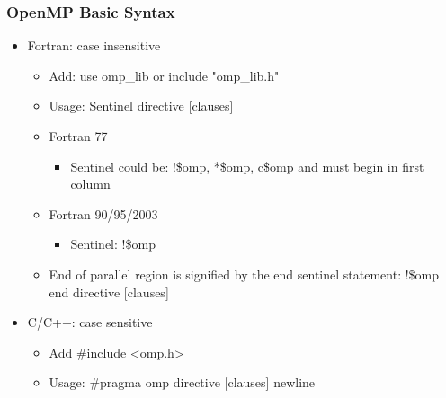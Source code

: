 \documentclass[10pt,t]{beamer}
\begin{document}
\begin{frame}
  \frametitle{OpenMP Basic Syntax}
  \begin{itemize}
    \item Fortran: case insensitive
    \begin{itemize}
      \item Add: {\color{green!40!black}use} {\color{blue}omp\_lib} or {\color{green!40!black}include} {\color{orange}"omp\_lib.h"}
      \item Usage: {\color{red!90!black}Sentinel directive [clauses]}
      \item Fortran 77
      \begin{itemize}
        \item {\color{red!90!black}Sentinel} could be: {\color{red!90!black}!\$omp, *\$omp, c\$omp} and must begin in first column
      \end{itemize}
      \item Fortran 90/95/2003
      \begin{itemize}
        \item {\color{red!90!black}Sentinel}: {\color{red!90!black}!\$omp}
      \end{itemize}
      \item End of parallel region is signified by the end sentinel statement: {\color{red!90!black}!\$omp end directive [clauses]}
    \end{itemize}
    \item C/C++: case sensitive
    \begin{itemize}
      \item Add {\color{green!40!black}\#include} <{\color{blue}omp.h}>
      \item Usage: {\color{red!90!black}\#pragma omp directive [clauses] newline}
    \end{itemize}
  \end{itemize}
\end{frame}
\end{document}
